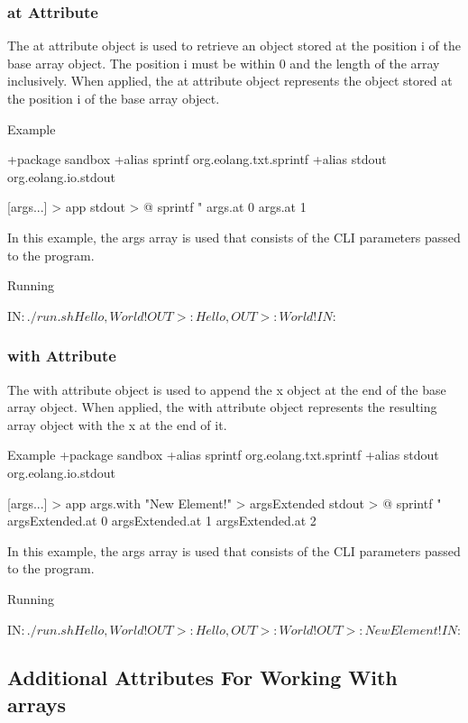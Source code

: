 \documentclass[12pt]{book}
\begin{document}
\subsubsection{at Attribute}
The at attribute object is used to retrieve an object stored at the position i of the base array object.
The position i must be within 0 and the length of the array inclusively.
When applied, the at attribute object represents the object stored at the position i of the base array object.

Example
\begin{ffcode}
+package sandbox
+alias sprintf org.eolang.txt.sprintf
+alias stdout org.eolang.io.stdout

[args...] > app
  stdout > @
    sprintf
      "%
      args.at 0
      args.at 1

\end{ffcode}

In this example, the args array is used that consists of the CLI parameters passed to the program.

Running
\begin{ffcode}
IN$: ./run.sh Hello, World!
OUT>: Hello,
OUT>: World!
IN$: 
\end{ffcode}

\subsubsection{with Attribute}
The with attribute object is used to append the x object at the end of the base array object.
When applied, the with attribute object represents the resulting array object with the x at the end of it.

\begin{ffcode}
Example
+package sandbox
+alias sprintf org.eolang.txt.sprintf
+alias stdout org.eolang.io.stdout

[args...] > app
  args.with "New Element!" > argsExtended
  stdout > @
    sprintf
      "%
      argsExtended.at 0
      argsExtended.at 1
      argsExtended.at 2

\end{ffcode}
In this example, the args array is used that consists of the CLI parameters passed to the program.

Running
\begin{ffcode}
IN$: ./run.sh Hello, World!
OUT>: Hello,
OUT>: World!
OUT>: New Element!
IN$: 
\end{ffcode}

\subsection{Additional Attributes For Working With arrays}
\end{document}
